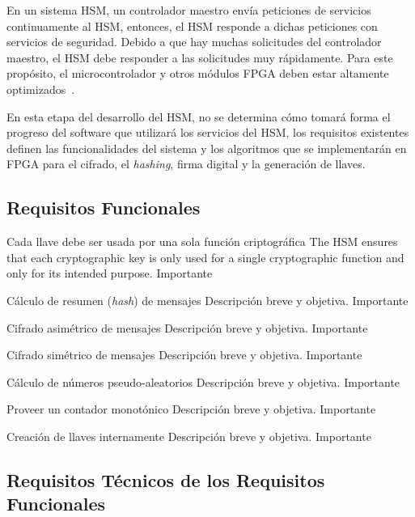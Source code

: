 \documentclass{article}
\begin{document}
En un sistema HSM, un controlador maestro envía peticiones de servicios continuamente al HSM, entonces, el HSM responde a dichas peticiones con servicios de seguridad. Debido a que hay muchas solicitudes del controlador maestro, el HSM debe responder a las solicitudes muy rápidamente. Para este propósito, el microcontrolador y otros módulos FPGA deben estar altamente optimizados~\cite{evita-hsm:2012}. 

En esta etapa del desarrollo del HSM, no se determina cómo tomará forma el progreso del software que utilizará los servicios del HSM, los requisitos existentes definen las funcionalidades del sistema y los algoritmos que se implementarán en FPGA para el cifrado, el \textit{hashing}, firma digital y la generación de llaves.

    \subsection{Requisitos Funcionales}
    \begin{functional}
		  {Cada llave debe ser usada por una sola función criptográfica}
      {The HSM ensures that each cryptographic key is only used for a single cryptographic function and only for its intended purpose.}
      {Importante}
    
		  {Cálculo de resumen (\textit{hash}) de mensajes}
      {Descripción breve y objetiva.}
      {Importante}
			
      {Cifrado asimétrico de mensajes}
      {Descripción breve y objetiva.}
      {Importante}
			
      {Cifrado simétrico de mensajes}
      {Descripción breve y objetiva.}
      {Importante}
			
      {Cálculo de números pseudo-aleatorios}
      {Descripción breve y objetiva.}
      {Importante}
			
			{Proveer un contador monotónico}
			{Descripción breve y objetiva.}
			{Importante}
			
			{Creación de llaves internamente}
			{Descripción breve y objetiva.}
			{Importante}
			
    \end{functional}

  \subsection{Requisitos Técnicos de los Requisitos Funcionales}
  
\end{document}
